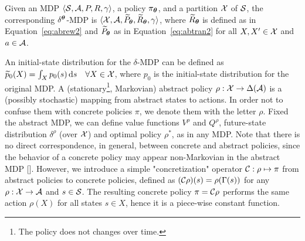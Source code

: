 %
\begin{definition}\label{def:abmdp}
	Given an \ac{MDP} $\langle\mathcal{S}, \mathcal{A}, P, R, \gamma\rangle$, a policy $\pi_{\boldsymbol{\theta}}$, and a partition $\mathcal{X}$ of $\mathcal{S}$, the corresponding $\delta^{\boldsymbol{\theta}}$-MDP is $\langle\mathcal{X}, \mathcal{A}, \widetilde{P}_{\boldsymbol{\theta}}, \widetilde{R}_{\boldsymbol{\theta}}, \gamma\rangle$, where $\widetilde{R}_{\boldsymbol{\theta}}$ is defined as in Equation~\eqref{eq:abrew2} and $\widetilde{P}_{\boldsymbol{\theta}}$ as in Equation~\eqref{eq:abtran2} for all $X,X'\in\mathcal{X}$ and $a\in\mathcal{A}$.
\end{definition}
%
\noindent An initial-state distribution for the $\delta$-\ac{MDP} can be defined as $\widetilde{p}_0(X) = \int_{X}p_0(s)\,\mathrm{d} s\quad\forall X\in\mathcal{X}$, where $p_0$ is the initial-state distribution for the original \ac{MDP}.
%
A (stationary\footnote{The policy does not changes over time.}, Markovian) abstract policy $\rho: \mathcal{X} \to \Delta(\mathcal{A})$ is a (possibly stochastic) mapping from abstract states to actions. In order not to confuse them with concrete policies $\pi$, we denote them with the letter $\rho$. Fixed the abstract \ac{MDP}, we can define value functions $V^{\rho}$ and $Q^{\rho}$, future-state distribution $\delta^{\rho}$ (over $\mathcal{X}$) and optimal policy $\rho^{*}$, as in any \ac{MDP}. Note that there is no direct correspondence, in general, between concrete and abstract policies, since the behavior of a concrete policy may appear non-Markovian in the abstract \ac{MDP} [\cite{lihong2006towards}].
However, we introduce a simple "concretization" operator $\mathcal{C}: \rho \mapsto \pi$ from abstract policies to concrete policies, defined as
$(\mathcal{C}\rho)(s) = \rho(\Gamma(s))$
for any $\rho:\mathcal{X}\to\mathcal{A}$ and $s\in\mathcal{S}$. The resulting concrete policy $\pi = \mathcal{C}\rho$ performs the same action $\rho(X)$ for all states $s\in X$, hence it is a piece-wise constant function.

